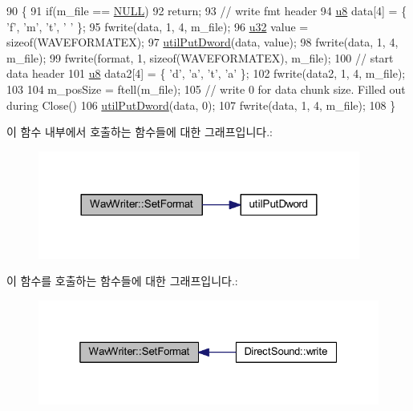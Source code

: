\begin{DoxyCode}
90 \{
91   \textcolor{keywordflow}{if}(m\_file == \mbox{\hyperlink{getopt1_8c_a070d2ce7b6bb7e5c05602aa8c308d0c4}{NULL}})
92     \textcolor{keywordflow}{return};
93   \textcolor{comment}{// write fmt header}
94   \mbox{\hyperlink{_system_8h_aed742c436da53c1080638ce6ef7d13de}{u8}} data[4] = \{ \textcolor{charliteral}{'f'}, \textcolor{charliteral}{'m'}, \textcolor{charliteral}{'t'}, \textcolor{charliteral}{' '} \};
95   fwrite(data, 1, 4, m\_file);
96   \mbox{\hyperlink{_system_8h_a10e94b422ef0c20dcdec20d31a1f5049}{u32}} value = \textcolor{keyword}{sizeof}(WAVEFORMATEX);
97   \mbox{\hyperlink{_util_8cpp_a61ef2cbdb9d8b5c50004ebd1557439c7}{utilPutDword}}(data, value);
98   fwrite(data, 1, 4, m\_file);
99   fwrite(format, 1, \textcolor{keyword}{sizeof}(WAVEFORMATEX), m\_file);
100   \textcolor{comment}{// start data header}
101   \mbox{\hyperlink{_system_8h_aed742c436da53c1080638ce6ef7d13de}{u8}} data2[4] = \{ \textcolor{charliteral}{'d'}, \textcolor{charliteral}{'a'}, \textcolor{charliteral}{'t'}, \textcolor{charliteral}{'a'} \};
102   fwrite(data2, 1, 4, m\_file);
103   
104   m\_posSize = ftell(m\_file);
105   \textcolor{comment}{// write 0 for data chunk size. Filled out during Close()}
106   \mbox{\hyperlink{_util_8cpp_a61ef2cbdb9d8b5c50004ebd1557439c7}{utilPutDword}}(data, 0);
107   fwrite(data, 1, 4, m\_file);
108 \}
\end{DoxyCode}
이 함수 내부에서 호출하는 함수들에 대한 그래프입니다.\+:
\nopagebreak
\begin{figure}[H]
\begin{center}
\leavevmode
\includegraphics[width=300pt]{class_wav_writer_a04fe7187eebeff2831af0bc85470744d_cgraph}
\end{center}
\end{figure}
이 함수를 호출하는 함수들에 대한 그래프입니다.\+:
\nopagebreak
\begin{figure}[H]
\begin{center}
\leavevmode
\includegraphics[width=325pt]{class_wav_writer_a04fe7187eebeff2831af0bc85470744d_icgraph}
\end{center}
\end{figure}


